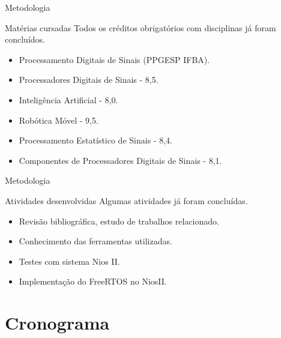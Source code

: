 \documentclass[10pt]{beamer}
\begin{document}
{
\begin{frame}{Metodologia}
	\begin{alertblock}{Matérias cursadas}
	Todos os créditos obrigatórios com disciplinas já foram concluídos.
	    \begin{itemize}
	        \item Processamento Digitais de Sinais (PPGESP IFBA).
	        \item Processadores Digitais de Sinais - 8,5.
	        \item Inteligência Artificial - 8,0.
	        \item Robótica Móvel - 9,5.
	        \item Processamento Estatístico de Sinais - 8,4.
	        \item Componentes de Processadores Digitais de Sinais - 8,1.
	    \end{itemize}
	\end{alertblock}
	
\end{frame}
}

{
\begin{frame}{Metodologia}
	\begin{alertblock}{Atividades desenvolvidas}
	Algumas atividades já foram concluídas.
	    \begin{itemize}
	        \item Revisão bibliográfica, estudo de trabalhos relacionado.
	        \item Conhecimento das ferramentas utilizadas.
	        \item Testes com sistema Nios II.
	        \item Implementação do FreeRTOS no NiosII.
	    \end{itemize}
	\end{alertblock}
	
\end{frame}
}



\section{Cronograma}
\end{document}
